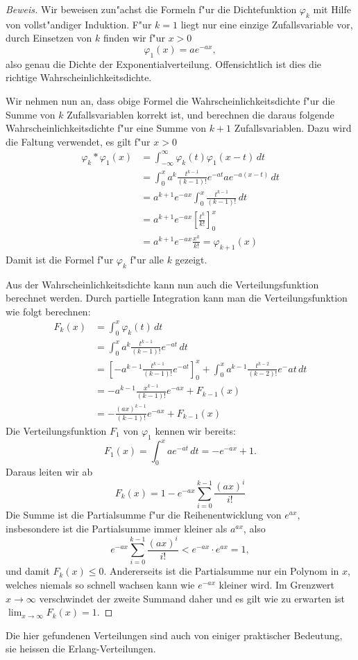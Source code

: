 \begin{proof}[Beweis]
Wir beweisen zun"achst die Formeln f"ur die Dichtefunktion $\varphi_k$ mit
Hilfe von vollst"andiger Induktion.
F"ur $k=1$ liegt nur eine einzige
Zufallsvariable vor, durch Einsetzen von $k$ finden wir f"ur $x>0$
\[
\varphi_1(x)=ae^{-ax},
\]
also genau die Dichte der Exponentialverteilung.
Offensichtlich ist dies die richtige Wahrscheinlichkeitsdichte.

Wir nehmen nun an, dass obige Formel die Wahrscheinlichkeitsdichte f"ur die
Summe von $k$ Zufallsvariablen korrekt ist, und berechnen die daraus
folgende Wahrscheinlichkeitsdichte f"ur eine Summe von $k+1$ Zufallsvariablen.
Dazu wird die Faltung verwendet, es gilt f"ur $x>0$
\begin{align*}
\varphi_k*\varphi_1(x)
&=
\int_{-\infty}^{\infty}\varphi_k(t)\varphi_1(x-t)\,dt\\
&=\int_0^x a^k\frac{t^{k-1}}{(k-1)!}e^{-at}ae^{-a(x-t)}\,dt\\
&=a^{k+1}e^{-ax}\int_0^x \frac{t^{k-1}}{(k-1)!}\,dt\\
&=a^{k+1}e^{-ax}\left[\frac{t^k}{k!}\right]_0^x\\
&=a^{k+1}e^{-ax}\frac{x^k}{k!}=\varphi_{k+1}(x)
\end{align*}
Damit ist die Formel f"ur $\varphi_k$ f"ur alle $k$ gezeigt.

Aus der Wahrscheinlichkeitsdichte kann nun auch die Verteilungsfunktion
berechnet werden.
Durch partielle Integration kann man die Verteilungsfunktion
wie folgt berechnen:
\begin{align*}
F_k(x)
&=\int_0^x\varphi_k(t)\,dt\\
&=\int_0^xa^k\frac{t^{k-1}}{(k-1)!}e^{-at}\,dt\\
&=\left[-a^{k-1}\frac{t^{k-1}}{(k-1)!}e^{-at}\right]_0^x+\int_0^xa^{k-1}\frac{t^{k-2}}{(k-2)!}e^-at\,dt\\
&=-a^{k-1}\frac{x^{k-1}}{(k-1)!}e^{-ax}+F_{k-1}(x)\\
&=-\frac{(ax)^{k-1}}{(k-1)!}e^{-ax}+F_{k-1}(x)
\end{align*}
Die Verteilungsfunktion $F_1$ von $\varphi_1$ kennen wir bereits:
\[
F_1(x)=\int_0^xae^{-at}\,dt=-e^{-ax}+1.
\]
Daraus leiten wir ab
\[
F_k(x)=1-e^{-ax}\sum_{i=0}^{k-1}\frac{(ax)^i}{i!}
\]
Die Summe ist die Partialsumme f"ur die Reihenentwicklung von $e^{ax}$,
insbesondere ist die Partialsumme immer kleiner als $a^{ax}$, also
\[
e^{-ax}\sum_{i=0}^{k-1}\frac{(ax)^i}{i!}<e^{-ax}\cdot e^{ax}=1,
\]
und damit $F_k(x) \le 0$.
Andererseits ist die Partialsumme nur ein
Polynom in $x$, welches niemals so schnell wachsen kann wie $e^{-ax}$ kleiner
wird.
Im Grenzwert $x\to\infty$ verschwindet der zweite Summand daher und
es gilt wie zu erwarten ist $\lim_{x\to\infty}F_k(x)=1$.
\end{proof}
Die hier gefundenen Verteilungen sind auch von einiger praktischer Bedeutung,
sie heissen die Erlang-Verteilungen.

